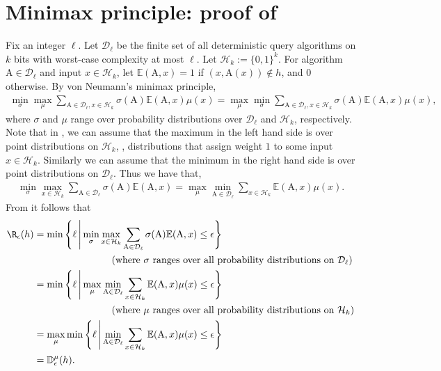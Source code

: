 \documentclass{toc}
\newcommand{\md}{\middle}
\newcommand{\sett}[2]{\ensuremath{\left\{#1\,\md|\,#2\right\}}}
\newcommand{\D}{\mathbb{D}}
\newcommand{\clD}{\mathcal{D}}
\newcommand{\clH}{\mathcal{H}}
\newcommand{\E}{\mathbb{E}}
\newcommand{\A}{\text{A}}
\begin{document}
%
%
%
%


%
%

\appendix

\section{Minimax principle: proof of }
\label{mmax}
Fix an integer $\ell$. Let $\mathcal{D}_\ell$ be the finite set of all deterministic query algorithms on $k$ bits with worst-case complexity at most $\ell$. Let $\clH_k:=\{0,1\}^k$. For algorithm $\A \in \clD_\ell$ and input $x \in \clH_k$, let $\E(\A,x)=1$ if $(x,\A(x)) \notin h$, and $0$ otherwise. By von Neumann's minimax principle,
\begin{align}\min_{\sigma} \max_{\mu} \sum_{\A \in \clD_\ell, x \in \clH_k} \sigma(\A)\E(\A, x)\mu(x)= \max_{\mu} \min_{\sigma} \sum_{\A \in \clD_\ell, x \in \clH_k} \sigma(\A)\E(\A, x)\mu(x),\label{mm}\end{align}
where $\sigma$ and $\mu$ range over probability distributions over $\clD_\ell$ and $\clH_k$, respectively.  Note that in , we can assume that the maximum in the left hand side is over  point distributions on $\clH_k$, \ie, distributions that assign weight $1$ to some input $x \in \clH_k$. Similarly we can assume that the minimum in the right hand side is over point distributions on $\clD_\ell$. Thus we have that,
\begin{align}
\min_{\sigma} \max_{x \in \clH_k} \sum_{\A \in \clD_\ell} \sigma(\A)\E(\A,x)=\max_{\mu} \min_{\A \in \clD_\ell}  \sum_{x \in \clH_k} \E(\A,x) \mu(x).\label{mm1}
\end{align}
From  it follows that
%
%
\begin{align*}
\R_\epsilon(h) &= \min \sett{\ell }{ \min_{\sigma} \max_{x \in \clH_k} \sum_{\A \in \clD_\ell} \sigma(\A)\E(\A,x) \leq \epsilon} \\
& \qquad \qquad \qquad \qquad \mbox{(where $\sigma$ ranges over all probability distributions on $\clD_\ell$)} \\
&= \min \sett{\ell} {\max_\mu \min_{\A \in \clD_\ell} \sum_{x \in \clH_k} \E(\A,x) \mu(x) \leq \epsilon}\\
& \qquad \qquad \qquad \qquad \mbox{(where $\mu$ ranges over all probability distributions on $\clH_k$)} \\
&=\max_{\mu} \min \sett{\ell}{\min_{\A \in \clD_\ell} \sum_{x \in \clH_k} \E(\A,x) \mu(x) \leq \epsilon} \\
&=\D^\mu_\epsilon(h).
\end{align*}
\end{document}
